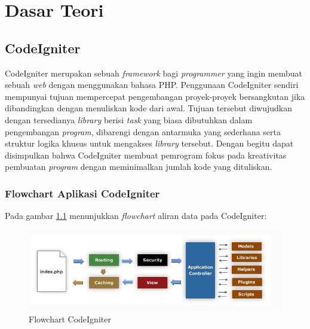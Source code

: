 \chapter{Dasar Teori}
\label{chap: dasarTeori}
	
\section{CodeIgniter}
\label{sec: codeigniter}

CodeIgniter\cite{ciDocs} merupakan sebuah \textit{framework} bagi \textit{programmer} yang ingin membuat sebuah \textit{web} dengan menggunakan bahasa PHP. Penggunaan CodeIgniter sendiri mempunyai tujuan mempercepat pengembangan proyek-proyek bersangkutan jika dibandingkan dengan menuliskan kode dari awal. Tujuan tersebut diwujudkan dengan tersedianya \textit{library} berisi \textit{task} yang biasa dibutuhkan dalam pengembangan \textit{program}, dibarengi dengan antarmuka yang sederhana serta struktur logika khusus untuk mengakses \textit{library} tersebut. Dengan begitu dapat disimpulkan bahwa CodeIgniter membuat pemrogram fokus pada kreativitas pembuatan \textit{program} dengan meminimalkan jumlah kode yang dituliskan.

\subsection{Flowchart Aplikasi CodeIgniter}
\label{sub: FlowAppCI}

Pada gambar \ref{fig:flowchartCI} menunjukkan \textit{flowchart} aliran data pada CodeIgniter:
\begin{figure}[H]
	\centering
	\includegraphics[scale=0.75]{Gambar/flowChartCI}
	\caption{Flowchart CodeIgniter}
	\label{fig:flowchartCI}
\end{figure}

